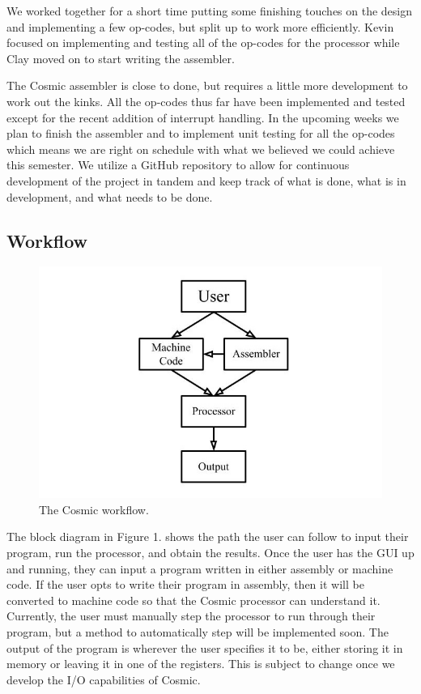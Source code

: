 \documentclass[conference]{IEEEtran}
\begin{document}
We worked together for a short time putting some finishing touches on the design and implementing a few op-codes, but split up to work more efficiently. Kevin focused on implementing and testing all of the op-codes for the processor while Clay moved on to start writing the assembler.

The Cosmic assembler is close to done, but requires a little more development to work out the kinks. All the op-codes thus far have been implemented and tested except for the recent addition of interrupt handling. In the upcoming weeks we plan to finish the assembler and to implement unit testing for all the op-codes which means we are right on schedule with what we believed we could achieve this semester. We utilize a GitHub repository to allow for continuous development of the project in tandem and keep track of what is done, what is in development, and what needs to be done.

\subsection{Workflow}
\begin{figure}[h!]
	\includegraphics[width=\linewidth]{block_dia.jpg}
	\caption{The Cosmic workflow.}
	\label{fig:Cosmic Workflow}
\end{figure}

The block diagram in Figure 1. shows the path the user can follow to input their program, run the processor, and obtain the results. Once the user has the GUI up and running, they can input a program written in either assembly or machine code. If the user opts to write their program in assembly, then it will be converted to machine code so that the Cosmic processor can understand it. Currently, the user must manually step the processor to run through their program, but a method to automatically step will be implemented soon. The output of the program is wherever the user specifies it to be, either storing it in memory or leaving it in one of the registers. This is subject to change once we develop the I/O capabilities of Cosmic.
\\
\\
\end{document}
